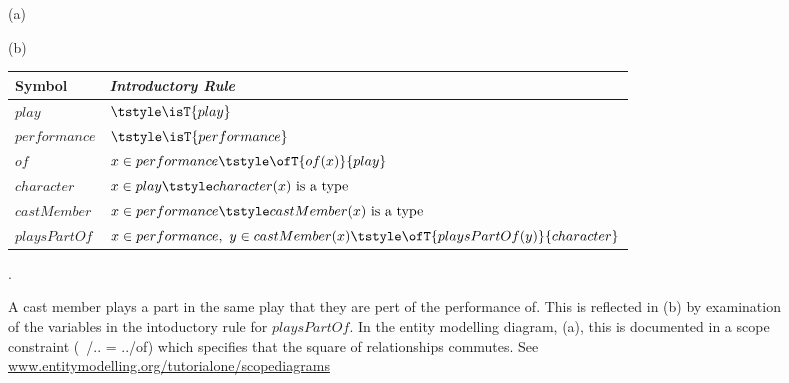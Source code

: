 \begin{frame}
\begin{center}
\begin{figure} [H]
(a) 

(b)
\begin{minipage}[c]{0.6 \textwidth}
\begin{tabular}{l l}
Symbol & \itshape{Introductory Rule} \\ 
\hline 
$play$ &$\tstyle \isT{play} $\\
$performance$ &$\tstyle \isT{performance} $\\
$of       $& $ x \in performance \tstyle \ofT{of(x)}{play}$ \\
$character$&$x \in play \tstyle character(x) \mbox{ is a type} $\\
$castMember$&$x \in performance \tstyle castMember(x) \mbox{ is a type}$ \\
$playsPartOf$& $ x \in performance ,\ y \in castMember(x) \tstyle \ofT{playsPartOf(y)}{character} $\\
\end{tabular}
\end{minipage}
\caption{A cast member plays a part in the same play that they are pert of the performance of. This is reflected in (b) by examination of the variables in the intoductory rule for $playsPartOf$. In the entity modelling diagram, (a), this is documented in a scope constraint (~/.. = ../of)  which specifies that the square of relationships commutes. See \href{http://www.entitymodelling.org/tutorialone/scopediagrams.html}
{www.entitymodelling.org/tutorialone/scopediagrams}}.
\label{citizen}
\end{figure}
\end{center}
\end{frame}

